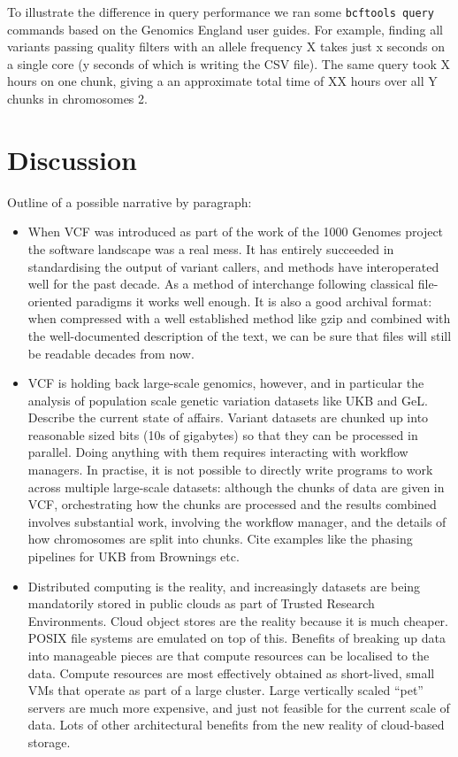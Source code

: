 \documentclass[a4paper,num-refs]{oup-contemporary}
\begin{document}
To illustrate the difference in query performance we ran some 
\texttt{bcftools query} commands based on the Genomics England 
user guides. For example, finding all variants passing 
quality filters with an allele frequency X takes just 
x seconds on a single core (y seconds of which is writing the 
CSV file). The same query took X hours on one chunk, giving a 
an approximate total time of XX hours over all Y chunks 
in chromosomes 2.

\section{Discussion}

Outline of a possible narrative by paragraph:
\begin{itemize}
\item When VCF was introduced as part of the work of the 1000 Genomes
project the software landscape was a real mess. It has entirely
succeeded in standardising the output of variant callers, and methods
have interoperated well for the past decade. As a method of interchange
following classical file-oriented paradigms it works well enough.
It is also a good archival format: when compressed with a well established
method like gzip and combined with the well-documented description of
the text, we can be sure that files will still be readable decades
from now.

\item VCF is holding back large-scale genomics, however, and in particular the
analysis of population scale genetic variation datasets like UKB and GeL.
Describe the current state of affairs. Variant datasets are chunked up
into reasonable sized bits (10s of gigabytes) so that they can be processed
in parallel. Doing anything with them requires interacting with workflow
managers. In practise, it is not possible to directly write programs to
work across multiple large-scale datasets: although the chunks of data
are given in VCF, orchestrating how the chunks are processed and
the results combined involves substantial work, involving the workflow
manager, and the details of how chromosomes are split into chunks.
Cite examples like the phasing pipelines for UKB from Brownings etc.

\item Distributed computing is the reality, and increasingly datasets
are being mandatorily stored in public clouds as part of
Trusted Research Environments. Cloud object stores are the reality
because it is much cheaper. POSIX file systems are emulated on top of
this. Benefits of breaking up data into manageable pieces are that
compute resources can be localised to the data. Compute resources are
most effectively obtained as short-lived, small VMs that operate
as part of a large cluster. Large vertically scaled ``pet'' servers
are much more expensive, and just not feasible for the current
scale of data. Lots of other architectural
benefits from the new reality of cloud-based storage.


\end{itemize}
\end{document}
